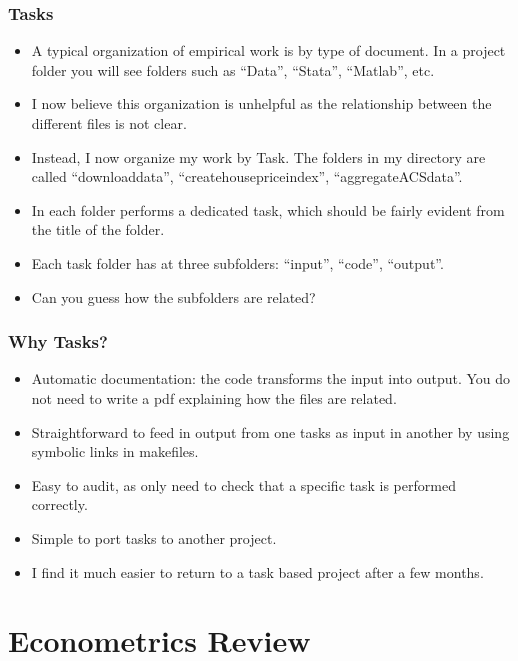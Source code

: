 \documentclass[english,xcolor=svgnames]{beamer}
\begin{document}
\begin{frame}
\frametitle[alignment=center]{Tasks}
\begin{itemize}
	\item A typical organization of empirical work is by type of document. In a project folder you will see folders such as ``Data'', ``Stata'', ``Matlab'', etc.
	\item I now believe this organization is unhelpful as the relationship between the different files is not clear.
	\item Instead, I now organize my work by Task. The folders in my directory are called ``downloaddata'', ``createhousepriceindex'', ``aggregateACSdata''.
	\item In each folder performs a dedicated task, which should be fairly evident from the title of the folder.
	\item Each task folder has at three subfolders: ``input'', ``code'', ``output''.
	\item Can you guess how the subfolders are related?
\end{itemize}
\end{frame}

\begin{frame}
\frametitle[alignment=center]{Why Tasks?}
\begin{itemize}
	\item Automatic documentation: the code transforms the input into output. You do not need to write a pdf explaining how the files are related.
	\item Straightforward to feed in output from one tasks as input in another by using symbolic links in makefiles.
	\item Easy to audit, as only need to check that a specific task is performed correctly.
	\item Simple to port tasks to another project.
	\item I find it much easier to return to a task based project after a few months.
\end{itemize}
\end{frame}



\section{Econometrics Review}
\end{document}
